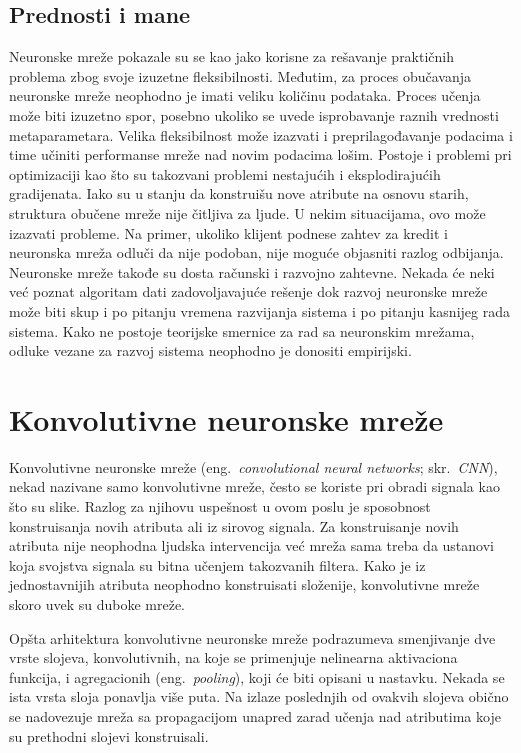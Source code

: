 \subsection{Prednosti i mane}

Neuronske mreže pokazale su se kao jako korisne za rešavanje praktičnih problema zbog svoje izuzetne fleksibilnosti. Međutim, za proces obučavanja neuronske mreže neophodno je imati veliku količinu podataka. Proces učenja može biti izuzetno spor, posebno ukoliko se uvede isprobavanje raznih vrednosti metaparametara. Velika fleksibilnost može izazvati i preprilagođavanje podacima i time učiniti performanse mreže nad novim podacima lošim. Postoje i problemi pri optimizaciji kao što su takozvani problemi nestajućih i eksplodirajućih gradijenata. Iako su u stanju da konstruišu nove atribute na osnovu starih, struktura obučene mreže nije čitljiva za ljude. U nekim situacijama, ovo može izazvati probleme. Na primer, ukoliko klijent podnese zahtev za kredit i neuronska mreža odluči da nije podoban, nije moguće objasniti razlog odbijanja. Neuronske mreže takođe su dosta računski i razvojno zahtevne. Nekada će neki već poznat algoritam dati zadovoljavajuće rešenje dok razvoj neuronske mreže može biti skup i po pitanju vremena razvijanja sistema i po pitanju kasnijeg rada sistema. 
Kako ne postoje teorijske smernice za rad sa neuronskim mrežama, odluke vezane za razvoj sistema neophodno je donositi empirijski.

\section{Konvolutivne neuronske mreže}
\label{sec:cnn}

Konvolutivne neuronske mreže (eng.~{\em convolutional neural networks}; skr.~{\em CNN}), nekad nazivane samo konvolutivne mreže, često se koriste pri obradi signala kao što su slike. Razlog za njihovu uspešnost u ovom poslu je sposobnost konstruisanja novih atributa ali iz sirovog signala. Za konstruisanje novih atributa nije neophodna ljudska intervencija već mreža sama treba da ustanovi koja svojstva signala su bitna učenjem takozvanih filtera. Kako je iz jednostavnijih atributa neophodno konstruisati složenije, konvolutivne mreže skoro uvek su duboke mreže.
\par 
Opšta arhitektura konvolutivne neuronske mreže podrazumeva smenjivanje dve vrste slojeva, konvolutivnih, na koje se primenjuje nelinearna aktivaciona funkcija, i agregacionih (eng.~{\em pooling}), koji će biti opisani u nastavku. Nekada se ista vrsta sloja ponavlja više puta. Na izlaze poslednjih od ovakvih slojeva obično se nadovezuje mreža sa propagacijom unapred zarad učenja nad atributima koje su prethodni slojevi konstruisali. 


